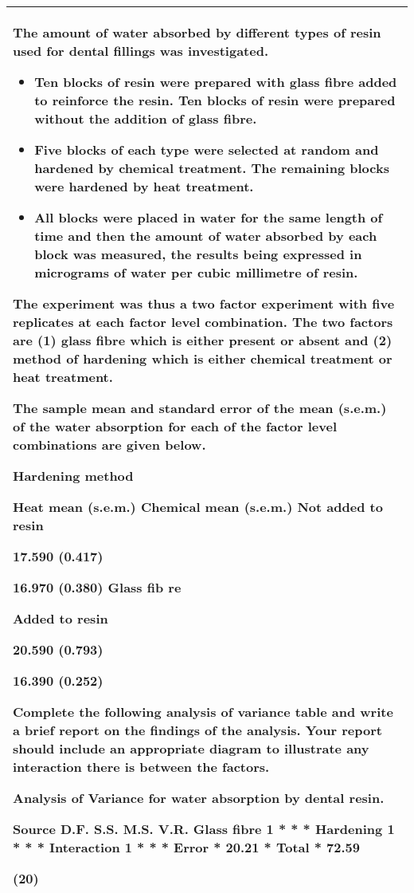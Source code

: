 \documentclass[a4paper,12pt]{article}
\begin{document}
\begin{table}[ht!]
 \centering
 \begin{tabular}{|p{15cm}|}
 \hline  
The amount of water absorbed by different types of resin used for dental fillings was investigated.  
\begin{itemize}
    \item Ten blocks of resin were prepared with glass fibre added to reinforce the resin.  Ten blocks of resin were prepared without the addition of glass fibre. 
    \item Five blocks of each type were selected at random and hardened by chemical treatment.  The remaining blocks were hardened by heat treatment.
    \item All blocks were placed in water for the same length of time and then the amount of water absorbed by each block was measured, the results being expressed in micrograms of water per cubic millimetre of resin. 
\end{itemize}
 
The experiment was thus a two factor experiment with five replicates at each factor level combination.  The two factors are (1) glass fibre which is either present or absent and (2) method of hardening which is either chemical treatment or heat treatment. 
 
The sample mean and standard error of the mean (s.e.m.) of the water absorption for each of the factor level combinations are given below. 
 
  Hardening method 
 
  Heat mean    (s.e.m.) 
Chemical mean    (s.e.m.) 
  Not added to resin 
 
17.590      (0.417) 
 
16.970      (0.380) 
Glass 
fib re 
   
  Added to resin 
 
20.590      (0.793) 
 
16.390      (0.252) 
 
 Complete the following analysis of variance table and write a brief report on the findings of the analysis.  Your report should include an appropriate diagram to illustrate any interaction there is between the factors. 
 
Analysis of Variance for water absorption by dental resin. 
 
Source D.F. S.S. M.S. V.R. Glass fibre 1 * * * Hardening 1 * * * Interaction 1 * * * Error * 20.21 *  Total * 72.59   
 
 
(20) 
\\ \hline
  \end{tabular}
\end{table}
\end{document}

